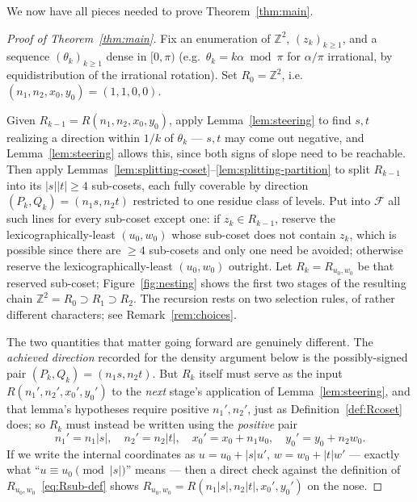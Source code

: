 \documentclass[a4paper,11pt,oneside,reqno]{amsart}
\theoremstyle{definition}
\theoremstyle{remark}
\theoremstyle{plain}
\newcommand{\Z}{\mathbb{Z}}
\begin{document}
We now have all pieces needed to prove Theorem~\ref{thm:main}.

\begin{proof}[Proof of Theorem~\ref{thm:main}]
  Fix an enumeration of \(\Z^2\), \((z_k)_{k\ge1}\), and a sequence \((\theta_k)_{k\ge1}\) dense in
  \([0,\pi)\) (e.g.\ \(\theta_k=k\alpha\bmod\pi\) for \(\alpha/\pi\) irrational, by equidistribution of
  the irrational rotation). Set \(R_0=\Z^2\), i.e.\ \((n_1,n_2,x_0,y_0)=(1,1,0,0)\).

  Given \(R_{k-1}=R(n_1,n_2,x_0,y_0)\), apply Lemma~\ref{lem:steering} to find \(s,t\) realizing a
  direction within \(1/k\) of \(\theta_k\) --- \(s,t\) may come out negative, and
  Lemma~\ref{lem:steering} allows this, since both signs of slope need to be reachable. Then apply
  Lemmas~\ref{lem:splitting-coset}--\ref{lem:splitting-partition} to split \(R_{k-1}\) into its
  \(|s||t|\ge4\) sub-cosets, each fully coverable by direction \((P_k,Q_k)=(n_1s,n_2t)\) restricted
  to one residue class of levels. Put into \(\mathcal F\) all such lines for every sub-coset except
  one: if \(z_k\in R_{k-1}\), reserve the lexicographically-least \((u_0,w_0)\) whose sub-coset does
  not contain \(z_k\), which is possible since there are \(\ge4\) sub-cosets and only one need be
  avoided; otherwise reserve the lexicographically-least \((u_0,w_0)\) outright. Let
  \(R_k=R_{u_0,w_0}\) be that reserved sub-coset; Figure~\ref{fig:nesting} shows the first two
  stages of the resulting chain \(\Z^2=R_0\supset R_1\supset R_2\). The recursion rests on two
  selection rules, of rather different characters; see Remark~\ref{rem:choices}.

  The two quantities that matter going forward are genuinely different. The \emph{achieved
  direction} recorded for the density argument below is the possibly-signed pair
  \((P_k,Q_k)=(n_1s,n_2t)\). But \(R_k\) itself must serve as the input \(R(n_1',n_2',x_0',y_0')\)
  to the \emph{next} stage's application of Lemma~\ref{lem:steering}, and that lemma's hypotheses
  require positive \(n_1',n_2'\), just as Definition~\ref{def:Rcoset} does; so \(R_k\) must instead
  be written using the \emph{positive} pair
  \[
    n_1'=n_1|s|, \quad n_2'=n_2|t|, \quad x_0'=x_0+n_1u_0, \quad y_0'=y_0+n_2w_0.
  \]
  If we write the internal coordinates as \(u=u_0+|s|u'\), \(w=w_0+|t|w'\) --- exactly what
  ``\(u\equiv u_0\pmod{|s|}\)'' means --- then a direct check against the definition of
  \(R_{u_0,w_0}\)~\eqref{eq:Rsub-def} shows \(R_{u_0,w_0}=R(n_1|s|,n_2|t|,x_0',y_0')\) on the nose.


\end{proof}
\end{document}
